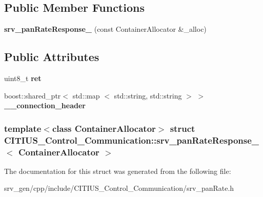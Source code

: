 \subsection*{\-Public \-Member \-Functions}
\begin{DoxyCompactItemize}
\item 
\hypertarget{struct_c_i_t_i_u_s___control___communication_1_1srv__pan_rate_response___a100dad6d3d3e2efd112c99cc0673fbb3}{{\bfseries srv\-\_\-pan\-Rate\-Response\-\_\-} (const \-Container\-Allocator \&\-\_\-alloc)}\label{struct_c_i_t_i_u_s___control___communication_1_1srv__pan_rate_response___a100dad6d3d3e2efd112c99cc0673fbb3}

\end{DoxyCompactItemize}
\subsection*{\-Public \-Attributes}
\begin{DoxyCompactItemize}
\item 
\hypertarget{struct_c_i_t_i_u_s___control___communication_1_1srv__pan_rate_response___a80702c8a184b614b0b6ee2e5745486b5}{uint8\-\_\-t {\bfseries ret}}\label{struct_c_i_t_i_u_s___control___communication_1_1srv__pan_rate_response___a80702c8a184b614b0b6ee2e5745486b5}

\item 
\hypertarget{struct_c_i_t_i_u_s___control___communication_1_1srv__pan_rate_response___ab0a3a0ec5a09c7874a66130693ed9baa}{boost\-::shared\-\_\-ptr$<$ std\-::map\*
$<$ std\-::string, std\-::string $>$ $>$ {\bfseries \-\_\-\-\_\-connection\-\_\-header}}\label{struct_c_i_t_i_u_s___control___communication_1_1srv__pan_rate_response___ab0a3a0ec5a09c7874a66130693ed9baa}

\end{DoxyCompactItemize}
\subsubsection*{template$<$class Container\-Allocator$>$ struct C\-I\-T\-I\-U\-S\-\_\-\-Control\-\_\-\-Communication\-::srv\-\_\-pan\-Rate\-Response\-\_\-$<$ Container\-Allocator $>$}



\-The documentation for this struct was generated from the following file\-:\begin{DoxyCompactItemize}
\item 
srv\-\_\-gen/cpp/include/\-C\-I\-T\-I\-U\-S\-\_\-\-Control\-\_\-\-Communication/srv\-\_\-pan\-Rate.\-h\end{DoxyCompactItemize}
